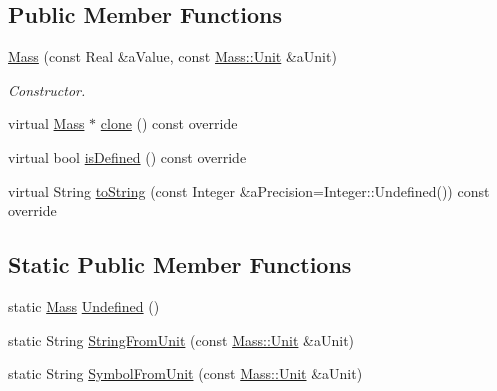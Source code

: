 \subsection*{Public Member Functions}
\begin{DoxyCompactItemize}
\item 
\hyperlink{classlibrary_1_1physics_1_1units_1_1_mass_a079df004a90cfe6cfa5c00ce0d816122}{Mass} (const Real \&a\+Value, const \hyperlink{classlibrary_1_1physics_1_1units_1_1_mass_a95f1e0434bc16794926b8e273bc2a54b}{Mass\+::\+Unit} \&a\+Unit)
\begin{DoxyCompactList}\small\item\em Constructor. \end{DoxyCompactList}\item 
virtual \hyperlink{classlibrary_1_1physics_1_1units_1_1_mass}{Mass} $\ast$ \hyperlink{classlibrary_1_1physics_1_1units_1_1_mass_a7a09438b05edbe4b21a05ec234a6372f}{clone} () const override
\item 
virtual bool \hyperlink{classlibrary_1_1physics_1_1units_1_1_mass_a0efde6eb08d6b79baa84229746776b6a}{is\+Defined} () const override
\item 
virtual String \hyperlink{classlibrary_1_1physics_1_1units_1_1_mass_a6e7757920752ac9f6918525d6fadb31e}{to\+String} (const Integer \&a\+Precision=Integer\+::\+Undefined()) const override
\end{DoxyCompactItemize}
\subsection*{Static Public Member Functions}
\begin{DoxyCompactItemize}
\item 
static \hyperlink{classlibrary_1_1physics_1_1units_1_1_mass}{Mass} \hyperlink{classlibrary_1_1physics_1_1units_1_1_mass_af3acc8762e8791a218e877595e94090b}{Undefined} ()
\item 
static String \hyperlink{classlibrary_1_1physics_1_1units_1_1_mass_ab2abb07bd20ab0a435b49b494f4ceb3f}{String\+From\+Unit} (const \hyperlink{classlibrary_1_1physics_1_1units_1_1_mass_a95f1e0434bc16794926b8e273bc2a54b}{Mass\+::\+Unit} \&a\+Unit)
\item 
static String \hyperlink{classlibrary_1_1physics_1_1units_1_1_mass_ad61ae35ac949926191b2517e674467a3}{Symbol\+From\+Unit} (const \hyperlink{classlibrary_1_1physics_1_1units_1_1_mass_a95f1e0434bc16794926b8e273bc2a54b}{Mass\+::\+Unit} \&a\+Unit)
\end{DoxyCompactItemize}



